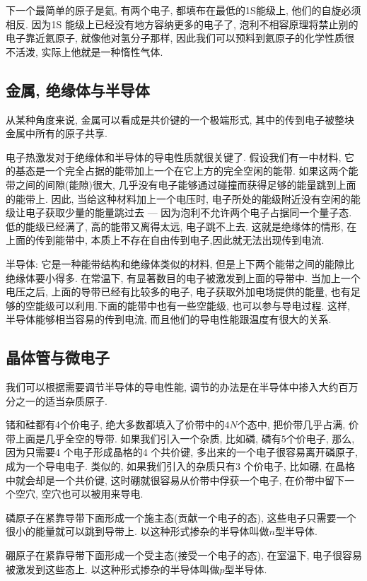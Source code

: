 \documentclass[openany]{book}
\begin{document}
下一个最简单的原子是氦, 有两个电子, 都填布在最低的1S能级上, 他们的自旋必须相反. 
因为1S 能级上已经没有地方容纳更多的电子了, 泡利不相容原理将禁止别的电子靠近氦原子, 就像他对氢分子那样, 
因此我们可以预料到氦原子的化学性质很不活泼, 实际上他就是一种惰性气体.

\subsection{金属, 绝缘体与半导体}
从某种角度来说, 金属可以看成是共价键的一个极端形式, 其中的传到电子被整块金属中所有的原子共享.

电子热激发对于绝缘体和半导体的导电性质就很关键了.
假设我们有一中材料, 它的基态是一个完全占据的能带加上一个在它上方的完全空闲的能带. 
如果这两个能带之间的间隙(能隙)很大, 几乎没有电子能够通过碰撞而获得足够的能量跳到上面的能带上.
因此, 当给这种材料加上一个电压时, 电子所处的能级附近没有空闲的能级让电子获取少量的能量跳过去 --- 因为泡利不允许两个电子占据同一个量子态. 
低的能级已经满了, 高的能带又离得太远, 电子跳不上去. 这就是绝缘体的情形, 在上面的传到能带中, 本质上不存在自由传到电子,因此就无法出现传到电流.

半导体: 它是一种能带结构和绝缘体类似的材料, 但是上下两个能带之间的能隙比绝缘体要小得多. 在常温下, 有显著数目的电子被激发到上面的导带中. 
当加上一个电压之后, 上面的导带已经有比较多的电子, 电子获取外加电场提供的能量, 也有足够的空能级可以利用.下面的能带中也有一些空能级, 也可以参与导电过程. 
这样, 半导体能够相当容易的传到电流, 而且他们的导电性能跟温度有很大的关系.

\subsection{晶体管与微电子}
我们可以根据需要调节半导体的导电性能, 调节的办法是在半导体中掺入大约百万分之一的适当杂质原子.

锗和硅都有4个价电子, 绝大多数都填入了价带中的$4N$个态中, 把价带几乎占满, 价带上面是几乎全空的导带. 
如果我们引入一个杂质, 比如磷, 磷有$5$个价电子, 那么, 因为只需要4 个电子形成晶格的4 个共价键, 多出来的一个电子很容易离开磷原子, 成为一个导电电子. 
类似的, 如果我们引入的杂质只有3 个价电子, 比如硼, 在晶格中就会却是一个共价键, 这时硼就很容易从价带中俘获一个电子, 在价带中留下一个空穴, 空穴也可以被用来导电.

磷原子在紧靠导带下面形成一个施主态(贡献一个电子的态), 这些电子只需要一个很小的能量就可以跳到导带上. 以这种形式掺杂的半导体叫做$n$型半导体.\par
硼原子在紧靠导带下面形成一个受主态(接受一个电子的态), 在室温下, 电子很容易被激发到这些态上. 以这种形式掺杂的半导体叫做$p$型半导体.
\end{document}
